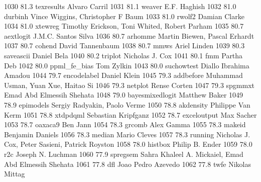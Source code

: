   1030     81.3    texresults    Alvaro Carril                           
  1031     81.1    weaver        E.F. Haghish                            
  1032     81.0    durbinh       Vince Wiggins, Christopher F Baum       
  1033     81.0    rwolf2        Damian Clarke                           
  1034     81.0    xtewreg       Timothy Erickson, Toni Whited, Robert   
                                   Parham                                  
  1035     80.7    aextlogit     J.M.C. Santos Silva                     
  1036     80.7    arhomme       Martin Biewen, Pascal Erhardt           
  1037     80.7    cohend        David Tannenbaum                        
  1038     80.7    mmws          Ariel Linden                            
  1039     80.3    saveascii     Daniel Bela                             
  1040     80.2    triplot       Nicholas J. Cox                         
  1041     80.1    fmm           Partha Deb                              
  1042     80.0    ppml_fe_bias  Tom Zylkin                              
  1043     80.0    suchowtest    Diallo Ibrahima Amadou                  
  1044     79.7    encodelabel   Daniel Klein                            
  1045     79.3    addbefore     Muhammad Usman, Yuan Xue, Haitao Si     
  1046     79.3    netplot       Rense Corten                            
  1047     79.3    spgmmxt       Emad Abd Elmessih Shehata               
  1048     79.0    bayesmixedlogit  Matthew Baker                           
  1049     78.9    epimodels     Sergiy Radyakin, Paolo Verme            
  1050     78.8    akdensity     Philippe Van Kerm                       
  1051     78.8    xtdpdqml      Sebastian Kripfganz                     
  1052     78.7    exceloutput   Max Sacher                              
  1053     78.7    oaxaca9       Ben Jann                                
  1054     78.3    grcomb        Alex Gamma                              
  1055     78.3    makeid        Benjamin Daniels                        
  1056     78.3    median        Mario Cleves                            
  1057     78.3    running       Nicholas J. Cox, Peter Sasieni, Patrick 
                                   Royston                                 
  1058     78.0    histbox       Philip B. Ender                         
  1059     78.0    r2c           Joseph N. Luchman                       
  1060     77.9    spregsem      Sahra Khaleel A. Mickaiel, Emad Abd     
                                   Elmessih Shehata                        
  1061     77.8    dfl           Joao Pedro Azevedo                      
  1062     77.8    twfe          Nikolas Mittag                          
